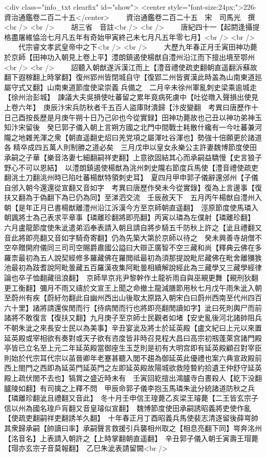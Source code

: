 <div class="info_txt clearfix" id="show">
<center style="font-size:24px;">226-資治通鑑卷二百二十五</center>
  　　資治通鑑卷二百二十五　宋　司馬光　撰<br />
<br />
　　胡三省　音註<br />
<br />
　　唐紀四十一【起閼逢攝提格盡屠維恊洽七月凡五年有奇始甲寅終己未七月凡五年零七月】<br />
<br />
　　代宗睿文孝武皇帝中之下<br />
<br />
　　大歷九年春正月壬寅田神功薨於京師【田神功入朝見上卷上平】澧朗鎮遏使楊猷自澧州沿江而下擅出境至鄂州<br />
<br />
　　詔聽入朝猷遂泝漢江而上【澧音禮使疏吏翻朝直遥翻泝蘇故翻下遐稼翻上時掌翻】復州郢州皆閉城自守【復郢二州皆賓漢此時盖為山南東道廵屬守式又翻】山南東道節度使梁崇義兵備之　二月辛未徐州軍亂刺史梁乘逾城走【徐州治彭城】　諫議大夫吳損使吐蕃留之累年竟病死虜中【吐從暾入聲損出使見上卷六年】　庚辰汴宋兵防秋者千五百人盜庫財潰歸【汴皮變翻　考異曰唐歷作十日己酉按長歷是月庚午朔十日乃己卯也今從實録】田神功薨故也己丑以神功弟神玉知汴宋留後　癸巳郭子儀入朝上言朔方國之北門中間戰士耗散什纔有一今吐蕃兼河隴之地雜羌渾之衆【朝直遥翻史炤曰羌党項之屬渾吐谷渾也】勢強十倍願更於諸道各精卒成四五萬人則制勝之道必矣　三月戊申以皇女永樂公主許妻魏博節度使田承嗣之子華【樂音洛妻七細翻嗣祥吏翻】上意欲固結其心而承嗣益驕慢【史言狼子野心不可以恩結】　以澧朗鎮遏使楊猷為洮州刺史隴右節度兵馬使【澧音禮使疏吏翻洮土刀翻洮州時已陷吐蕃楊猷特領刺史耳】　夏四月甲申郭子儀辭還邠州【子儀自邠入朝今還還從宣翻又音如字　考異曰唐歷作癸未今從實錄】復為上言邊事【復扶又翻為于偽翻下為已仍為同】至涕泗交流　壬辰赦天下　五月丙午楊猷自澧州入朝【是年正月已書楊猷離澧州沿江泝漢今方至京師朝直遥翻】　涇原節度使馬璘入朝諷將士為己表求平章事【璘離珍翻將即亮翻】丙寅以璘為左僕射【璘離珍翻】　六月盧龍節度使朱泚遣弟滔奉表請入朝且請自將步騎五千防秋上許之【泚且禮翻又音此將即亮翻又音如字騎奇寄翻】仍為先築大第於京師以待之　癸未興善寺胡僧不空卒贈開府儀同三司司空賜爵肅國公謚曰大辯正廣智不空三藏和尚【釋典云佛在多羅柰最初為五人說契經修多羅藏佛在羅閲祗最初為須那提說毗尼藏佛在毗舍離獼㺅池最初為跂耆說阿毗曇藏五百羅漢夜集阿毗曇相續解說經此為三藏學又三藏學經律論也卒子恤翻藏徂浪翻】　京師旱京兆尹黎幹作土龍祈雨自與巫覡更舞【覡刑狄翻更工衡翻】彌月不雨又禱於文宣王上聞之命撤土龍減膳節用秋七月戊午雨朱泚入朝至蔚州有疾【蔚紆勿翻此自幽州西出山後取太原路入朝宋白曰蔚州西南至代州四百六十里】諸將請還俟閒而行【待病閒而行也將即亮翻閒讀如字】泚曰死則輿尸而前諸將不敢復言【復扶又翻】九月庚子至京師士民觀者如堵【安史亂後河北諸帥阻兵不朝朱泚之來長安士民以為美事】辛丑宴泚及將士於延英殿【盧文紀曰上元以來置延英殿或宰相欲有奏對或天子欲有咨度皆非時召見程大昌曰高宗初剏蓬萊宫諸門殿亭皆已立名至上元二年延英殿當御座生玉芝則是初有大明宫即有延英殿顧召對宰臣則始於代宗耳代宗以苖晉卿年老蹇甚聽入閭不趨為御延英此優禮也案六典宣政殿前西上閤門之西即為延英門延英門之左即延英殿故陽城欲救陸䞇約拾遺王仲舒守延英殿上疏伏閤不去也】犒賞之盛近時未有　壬寅回紇擅出鴻臚寺白晝殺人【紇下没翻臚陵如翻】有司擒之上釋不問　甲辰命郭子儀李抱玉馬璘朱泚分統諸道防秋之兵【璘離珍翻泚且禮翻又音此】　冬十月壬申信王瑝薨乙亥梁王璿薨【二王皆玄宗子信以州為國名瑝戶肓翻又音皇璿似宣翻】　魏博節度使田承嗣誘昭義將吏使作亂【使疏吏翻嗣祥吏翻誘羊久翻】　十年春正月丁酉昭義兵馬使裴志清逐留後薛㟧帥其衆歸承嗣【帥讀曰率】承嗣聲言救援引兵襲相州取之【相息亮翻下同】㟧奔洺州【洺音名】上表請入朝許之【上時掌翻朝直遥翻】　辛丑郭子儀入朝壬寅壽王瑁薨【瑁亦玄宗子音莫報翻】　乙巳朱泚表請留闕<br />
